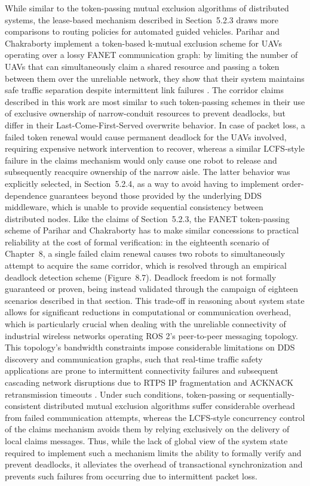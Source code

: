 While similar to the token-passing mutual exclusion algorithms of distributed systems, the lease-based mechanism described in Section~5.2.3 draws more comparisons to routing policies for automated guided vehicles. Parihar and Chakraborty implement a token-based k-mutual exclusion scheme for UAVs operating over a lossy FANET communication graph: by limiting the number of UAVs that can simultaneously claim a shared resource and passing a token between them over the unreliable network, they show that their system maintains safe traffic separation despite intermittent link failures \cite{parihar2022token}. The corridor claims described in this work are most similar to such token-passing schemes in their use of exclusive ownership of narrow-conduit resources to prevent deadlocks, but differ in their Last-Come-First-Served overwrite behavior. In case of packet loss, a failed token renewal would cause permanent deadlock for the UAVs involved, requiring expensive network intervention to recover, whereas a similar LCFS-style failure in the claims mechanism would only cause one robot to release and subsequently reacquire ownership of the narrow aisle. The latter behavior was explicitly selected, in Section~5.2.4, as a way to avoid having to implement order-dependence guarantees beyond those provided by the underlying DDS middleware, which is unable to provide sequential consistency between distributed nodes. Like the claims of Section~5.2.3, the FANET token-passing scheme of Parihar and Chakraborty has to make similar concessions to practical reliability at the cost of formal verification: in the eighteenth scenario of Chapter~8, a single failed claim renewal causes two robots to simultaneously attempt to acquire the same corridor, which is resolved through an empirical deadlock detection scheme (Figure~8.7). Deadlock freedom is not formally guaranteed or proven, being instead validated through the campaign of eighteen scenarios described in that section. This trade-off in reasoning about system state allows for significant reductions in computational or communication overhead, which is particularly crucial when dealing with the unreliable connectivity of industrial wireless networks operating ROS 2's peer-to-peer messaging topology. This topology's bandwidth constraints impose considerable limitations on DDS discovery and communication graphs, such that real-time traffic safety applications are prone to intermittent connectivity failures and subsequent cascading network disruptions due to RTPS IP fragmentation and ACKNACK retransmission timeouts \cite{lee2025optimizing}. Under such conditions, token-passing or sequentially-consistent distributed mutual exclusion algorithms suffer considerable overhead from failed communication attempts, whereas the LCFS-style concurrency control of the claims mechanism avoids them by relying exclusively on the delivery of local claims messages. Thus, while the lack of global view of the system state required to implement such a mechanism limits the ability to formally verify and prevent deadlocks, it alleviates the overhead of transactional synchronization and prevents such failures from occurring due to intermittent packet loss.

